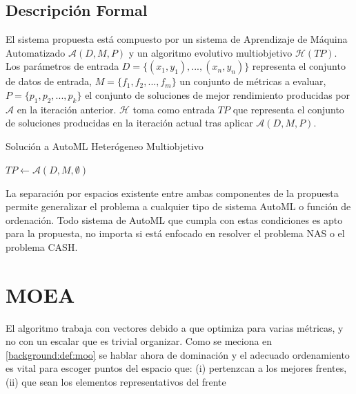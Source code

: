 \subsection{Descripci\'on Formal}
El sistema propuesta est\'a compuesto por un sistema de Aprendizaje de M\'aquina Automatizado $\mathcal{A}(D, M, P)$  y un algoritmo evolutivo multiobjetivo $\mathcal{H}(TP)$. Los par\'ametros de entrada $D = \{(x_1, y_1), ..., (x_n, y_n)\}$ representa el conjunto de datos de entrada, $M = \{f_1, f_2, ..., f_m\}$ un conjunto de m\'etricas a evaluar, $P = \{p_1, p_2, ..., p_k\}$ el conjunto de soluciones de mejor rendimiento producidas por  $\mathcal{A}$ en la iteraci\'on anterior. $\mathcal{H}$ toma como entrada $TP$ que representa el conjunto de soluciones producidas en la iteraci\'on actual tras aplicar $\mathcal{A}(D, M, P)$. 
\begin{algorithm}[ht]\caption{Soluci\'on a AutoML Heter\'ogeneo Multiobjetivo}
    $TP \gets \mathcal{A}(D, M, \emptyset)$ 
\end{algorithm}

La separaci\'on  por espacios existente entre ambas componentes de la propuesta permite generalizar el problema a cualquier tipo de sistema AutoML o funci\'on de ordenaci\'on. Todo sistema de AutoML que cumpla con estas condiciones es apto para la propuesta, no importa si est\'a enfocado en resolver el problema NAS o el problema CASH.

\section{MOEA}
El algoritmo trabaja con vectores debido a que optimiza para varias m\'etricas, y no con un escalar que es trivial organizar. Como se meciona en \ref{background:def:moo} se hablar ahora de dominaci\'on y el adecuado ordenamiento es vital para escoger puntos del espacio que: (i) pertenzcan a los mejores frentes, (ii) que sean los elementos representativos del frente

